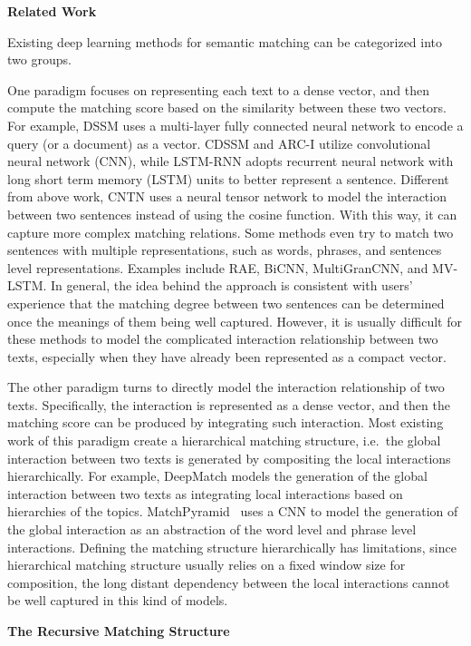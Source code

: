 \textbf{Related Work}

Existing deep learning methods for semantic matching can be categorized into two groups.

One paradigm focuses on representing each text to a dense vector, and then compute the matching score based on the similarity between these two vectors. For example, DSSM uses a multi-layer fully connected neural network to encode a query (or a document) as a vector.
CDSSM and ARC-I utilize convolutional neural network (CNN), while LSTM-RNN adopts recurrent neural network with long short term memory (LSTM) units to better represent a sentence.
Different from above work, CNTN uses a neural tensor network to model the interaction between two sentences instead of using the cosine function. With this way, it can capture more complex matching relations. Some methods even try to match two sentences with multiple representations, such as words, phrases, and sentences level representations. Examples include RAE, BiCNN, MultiGranCNN, and MV-LSTM. In general, the idea behind the approach is consistent with users' experience that the matching degree between two sentences can be determined once the meanings of them being well captured. However, it is usually difficult for these methods to model the complicated interaction relationship between two texts, especially when they have already been represented as a compact vector.

The other paradigm turns to directly model the interaction relationship of two texts. Specifically, the interaction is represented as a dense vector, and then the matching score can be produced by integrating such interaction. Most existing work of this paradigm create a hierarchical matching structure, i.e.~the global interaction between two texts is generated by compositing the local interactions hierarchically.
For example, DeepMatch models the generation of the global interaction between two texts as integrating local interactions based on hierarchies of the topics. MatchPyramid~\cite{Pang2016TextMA} uses a CNN to model the generation of the global interaction as an abstraction of the word level and phrase level interactions. Defining the matching structure hierarchically has limitations, since hierarchical matching structure usually relies on a fixed window size for composition, the long distant dependency between the local interactions cannot be well captured in this kind of models.

\textbf{The Recursive Matching Structure}

